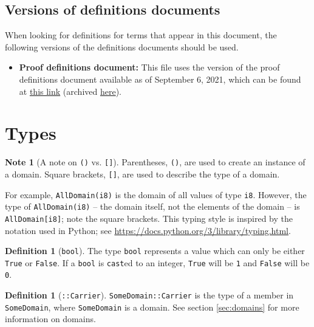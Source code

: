 \documentclass[11pt,a4paper]{article}
\theoremstyle{definition}
\newtheorem{definition}[theorem]{Definition}
\newtheorem{note}[theorem]{Note}
\begin{document}
\subsection{Versions of definitions documents}
\label{sec:versioned-docs}

When looking for definitions for terms that appear in this document, the following versions of the definitions documents should be used.

\begin{itemize}
    \item \textbf{Proof definitions document:} This file uses the version of the proof definitions document available as of September 6, 2021, which can be found at \href{https://github.com/opendp/whitepapers/blob/d4c24e55cc37878634fec0b7f5c89259a3ad3ded/proof-defns/proof_defns.pdf}{this link} (archived \href{https://web.archive.org/web/20210906201056/https://raw.githubusercontent.com/opendp/whitepapers/proof-defns/proof-defns/proof_defns.pdf}{here}). 
\end{itemize}

\section{Types}

\begin{note}[A note on \texttt{()} vs. \texttt{[]}] Parentheses, \texttt{()}, are used to create an instance of a domain. Square brackets, \texttt{[]}, are used to describe the type of a domain.

For example, \texttt{AllDomain(i8)} is the domain of all values of type \texttt{i8}. However, the type of \texttt{AllDomain(i8)} -- the domain itself, not the elements of the domain -- is \texttt{AllDomain[i8]}; note the square brackets. This typing style is inspired by the notation used in Python; see \url{https://docs.python.org/3/library/typing.html}.
\end{note}

\begin{definition}[\texttt{bool}]
    The type \texttt{bool} represents a value which can only be either \texttt{True} or \texttt{False}. If a \texttt{bool} is \texttt{cast}ed to an integer, \texttt{True} will be \texttt{1} and \texttt{False} will be \texttt{0}.
\end{definition}

\begin{definition}[\texttt{::Carrier}]
\texttt{SomeDomain::Carrier} is the type of a member in \texttt{SomeDomain}, where \texttt{SomeDomain} is a domain. See section \ref{sec:domains} for more information on domains. 
\end{definition}
\end{document}
